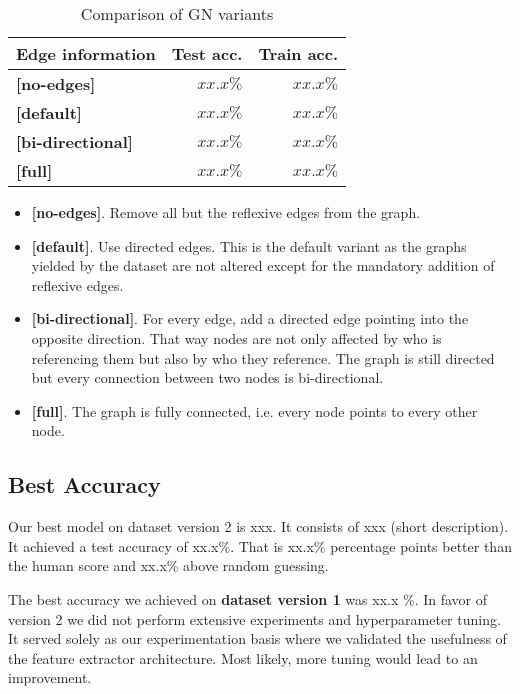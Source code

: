 \begin{table}
    \centering
    \begin{tabular}{lrr}
        \textbf{Edge information} & \textbf{Test acc.} & \textbf{Train acc.}\\\hline
        \textbf{[no-edges]} & $xx.x\%$ & $xx.x\%$\\
        \textbf{[default]} & $xx.x\%$ & $xx.x\%$\\
        \textbf{[bi-directional]} & $xx.x\%$ & $xx.x\%$\\
        \textbf{[full]} & $xx.x\%$ & $xx.x\%$\\
    \end{tabular}
    \caption[Comparison of GN variants]{Comparison of GN variants}
    \label{tab:edgecomparison}
\end{table}

\begin{itemize}
    \item \textbf{[no-edges]}. Remove all but the reflexive edges from the graph.
    \item \textbf{[default]}. Use directed edges. This is the default variant as the graphs yielded by the dataset are not altered except for the mandatory addition of reflexive edges.
    \item \textbf{[bi-directional]}. For every edge, add a directed edge pointing into the opposite direction. That way nodes are not only affected by who is referencing them but also by who they reference. The graph is still directed but every connection between two nodes is bi-directional.
    \item \textbf{[full]}. The graph is fully connected, i.e. every node points to every other node.
\end{itemize}

\subsection{Best Accuracy}

Our best model on dataset version 2 is xxx. It consists of xxx (short description). It achieved a test accuracy of xx.x\%. That is xx.x\% percentage points better than the human score and xx.x\% above random guessing.

The best accuracy we achieved on \textbf{dataset version 1} was xx.x \%. In favor of version 2 we did not perform extensive experiments and hyperparameter tuning. It served solely as our experimentation basis where we validated the usefulness of the feature extractor architecture. Most likely, more tuning would lead to an improvement.
